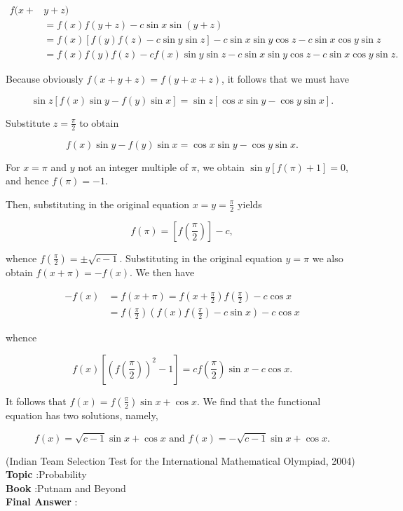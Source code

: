 \documentclass[10pt]{article}
\begin{document}
$$
\begin{aligned}
f(x+&y+z) \\
&=f(x) f(y+z)-c \sin x \sin (y+z) \\
&=f(x)[f(y) f(z)-c \sin y \sin z]-c \sin x \sin y \cos z-c \sin x \cos y \sin z \\
&=f(x) f(y) f(z)-c f(x) \sin y \sin z-c \sin x \sin y \cos z-c \sin x \cos y \sin z .
\end{aligned}
$$

Because obviously $f(x+y+z)=f(y+x+z)$, it follows that we must have

$$
\sin z[f(x) \sin y-f(y) \sin x]=\sin z[\cos x \sin y-\cos y \sin x] .
$$

Substitute $z=\frac{\pi}{2}$ to obtain

$$
f(x) \sin y-f(y) \sin x=\cos x \sin y-\cos y \sin x .
$$

For $x=\pi$ and $y$ not an integer multiple of $\pi$, we obtain $\sin y[f(\pi)+1]=0$, and hence $f(\pi)=-1$.

Then, substituting in the original equation $x=y=\frac{\pi}{2}$ yields

$$
f(\pi)=\left[f\left(\frac{\pi}{2}\right)\right]-c,
$$

whence $f\left(\frac{\pi}{2}\right)=\pm \sqrt{c-1}$. Substituting in the original equation $y=\pi$ we also obtain $f(x+\pi)=-f(x)$. We then have

$$
\begin{aligned}
-f(x) &=f(x+\pi)=f\left(x+\frac{\pi}{2}\right) f\left(\frac{\pi}{2}\right)-c \cos x \\
&=f\left(\frac{\pi}{2}\right)\left(f(x) f\left(\frac{\pi}{2}\right)-c \sin x\right)-c \cos x
\end{aligned}
$$

whence

$$
f(x)\left[\left(f\left(\frac{\pi}{2}\right)\right)^{2}-1\right]=c f\left(\frac{\pi}{2}\right) \sin x-c \cos x .
$$

It follows that $f(x)=f\left(\frac{\pi}{2}\right) \sin x+\cos x$. We find that the functional equation has two solutions, namely,

$$
f(x)=\sqrt{c-1} \sin x+\cos x \text { and } f(x)=-\sqrt{c-1} \sin x+\cos x .
$$

(Indian Team Selection Test for the International Mathematical Olympiad, 2004)
\\
\textbf{Topic} :Probability\\
\textbf{Book} :Putnam and Beyond\\
\textbf{Final Answer} :\\
\end{document}
